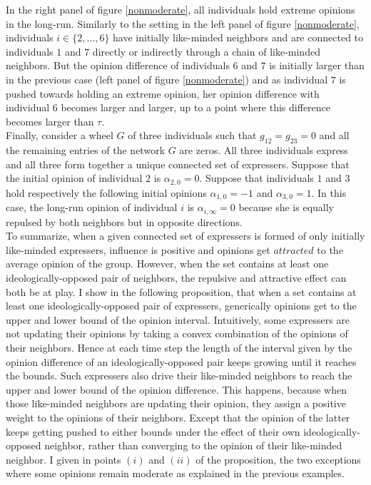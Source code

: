 \documentclass{article}
\begin{document}
In the right panel of figure \ref{nonmoderate}, all individuals hold extreme opinions in the long-run. Similarly to the setting in the left panel of figure \ref{nonmoderate}, individuals  $i \in \{2, \ldots, 6\}$ have initially like-minded neighbors and are connected to individuals $1$ and $7$ directly or indirectly through a chain of like-minded neighbors. But the opinion difference of individuals $6$ and $7$ is initially larger than in the previous case (left panel of figure \ref{nonmoderate}) and as individual $7$ is pushed towards holding an extreme opinion, her opinion difference with individual $6$ becomes larger and larger, up to a point where this difference becomes larger than $\tau$.     \\

Finally, consider a wheel $G$ of three individuals such that $g_{12}=g_{23}=0$ and all the remaining entries of the network $G$ are zeros. All three individuals express and all three form together a unique connected set of expressers. Suppose that the initial opinion of individual $2$ is $\alpha_{2,0}=0$. Suppose that individuals $1$ and $3$ hold respectively the following initial opinions $\alpha_{1,0}=-1$ and $\alpha_{3,0}=1$. In this case, the long-run opinion of individual $i$ is $\alpha_{i,\infty} =0$ because she is equally repulsed by both neighbors but in opposite directions. \\

To summarize, when a given connected set of expressers is formed of only initially like-minded expressers, influence is positive and opinions get $attracted$ to the average opinion of the group. However, when the set contains at least one ideologically-opposed pair of neighbors, the repulsive and attractive effect can both be at play. I show in the following proposition, that when a set contains at least one ideologically-opposed pair of expressers, generically opinions get to the upper and lower bound of the opinion interval. Intuitively, some expressers are not updating their opinions by taking a convex combination of the opinions of their neighbors. Hence at each time step the length of the interval given by the opinion difference of an ideologically-opposed pair keeps growing until it reaches the bounds. Such expressers also drive their like-minded neighbors to reach the upper and lower bound of the opinion difference. This happens, because when those like-minded neighbors are updating their opinion, they assign a positive weight to the opinions of their neighbors. Except that the opinion of the latter keeps getting pushed to either bounds under the effect of their own ideologically-opposed neighbor, rather than converging to the opinion of their like-minded neighbor. I given in points $(i)$ and $(ii)$ of the proposition, the two exceptions where some opinions remain moderate as explained in the previous examples. \\
\end{document}
